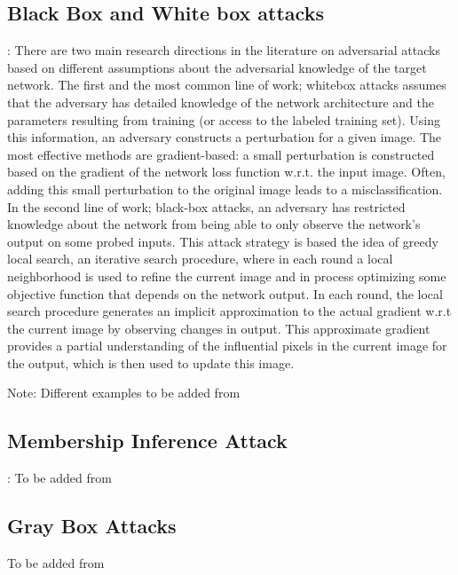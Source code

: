 \documentclass{article}
\begin{document}
 \subsection{Black Box and White box attacks}: There are two main research directions in the literature on adversarial attacks based on different assumptions about the adversarial knowledge of the target network. The first and the most common line of work; whitebox attacks assumes that the adversary has detailed knowledge of the network architecture and the parameters resulting from training (or access to the labeled training set). Using this information, an adversary constructs a perturbation for a given image. The most effective methods are gradient-based: a small perturbation is constructed based on the gradient of the network loss function w.r.t. the input image. Often, adding this small perturbation to the original image leads to a misclassification. In the second line of work; black-box attacks, an adversary has restricted knowledge about the network from being able to only observe the network’s output on some probed inputs. This attack strategy is based the idea of greedy local search, an iterative search procedure, where in each round a local neighborhood is used to refine the current image and in process optimizing some objective function that depends on the network output. In each round, the local search procedure generates an implicit approximation to the actual gradient w.r.t the current image by observing changes in output. This approximate gradient provides a partial understanding of the influential pixels in the current image for the output, which is then used to update this image. 
 
 Note: Different examples to be added from \cite{rosenberg2017generic}
 
\subsection{Membership Inference Attack}:
To be added from \cite{shokri2017membership}

\subsection{Gray Box Attacks}
To be added from \cite{moosavi2016deepfool}



\end{document}

